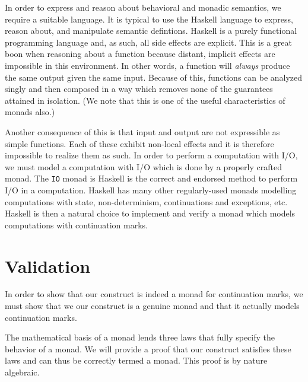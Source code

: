 \documentclass[ms]{byuprop}
\begin{document}
In order to express and reason about behavioral and monadic semantics, we require a suitable 
language. It is typical to use the Haskell language \cite{jones2003haskell} to express, reason 
about, and manipulate semantic defintions. Haskell is a purely functional programming language 
and, as such, all side effects are explicit. This is a great boon when reasoning about a 
function because distant, implicit effects are impossible in this environment. In other words, 
a function will \emph{always} produce the same output given the same input. Because of this, 
functions can be analyzed singly and then composed in a way which removes none of the guarantees 
attained in isolation. (We note that this is one of the useful characteristics of monads also.)


Another consequence of this is that input and output are not expressible as simple
functions. Each of these exhibit non-local effects and it is therefore impossible to
realize them as such. In order to perform a computation with I/O, we must model a
computation with I/O which is done by a properly crafted monad. The \texttt{IO} monad is
Haskell is the correct and endorsed method to perform I/O in a computation. Haskell has
many other regularly-used monads modelling computations with state, non-determinism,
continuations and exceptions, etc. Haskell is then a natural choice to implement and
verify a monad which models computations with continuation marks.

\section{Validation}


In order to show that our construct is indeed a monad for continuation marks, we must show
that we our construct is a genuine monad and that it actually models continuation marks.

The mathematical basis of a monad lends three laws that fully specify the behavior of a 
monad. We will provide a proof that our construct satisfies these laws and can thus be 
correctly termed a monad. This proof is by nature algebraic.
\end{document}

